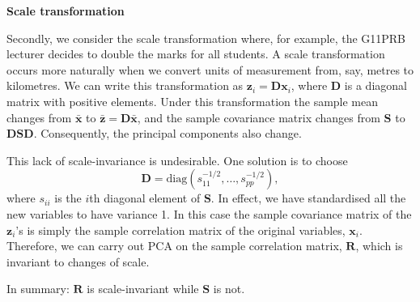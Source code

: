\documentclass[]{book}
\theoremstyle{definition}
\theoremstyle{definition}
\theoremstyle{definition}
\theoremstyle{remark}
\begin{document}
\textbf{Scale transformation}

Secondly, we consider the scale transformation where, for example, the G11PRB lecturer decides to double the marks for all students. A scale transformation occurs more naturally when we convert units of measurement from, say, metres to kilometres. We can write this transformation as \(\boldsymbol z_i = \boldsymbol D\boldsymbol x_i\), where \(\boldsymbol D\) is a diagonal matrix with positive elements. Under this transformation the sample mean changes from \(\bar{\boldsymbol x}\) to \(\bar{\boldsymbol z} = \boldsymbol D\bar{\boldsymbol x}\), and the sample covariance matrix changes from \(\boldsymbol S\) to \(\boldsymbol D\boldsymbol S\boldsymbol D\). Consequently, the principal components also change.

This lack of scale-invariance is undesirable. One solution is to choose
\[
\boldsymbol D= \text{diag}(s_{11}^{-1/2}, \ldots , s_{pp}^{-1/2}),
 \]
where \(s_{ii}\) is the \(i\)th diagonal element of \(\boldsymbol S\). In effect, we have standardised all the new variables to have variance 1. In this case the sample covariance matrix of the \(\boldsymbol z_i\)'s is simply the sample correlation matrix of the original variables, \(\boldsymbol x_i\). Therefore, we can carry out PCA on the sample correlation matrix, \(\boldsymbol R\), which is invariant to changes of scale.

In summary: \(\boldsymbol R\) is scale-invariant while \(\boldsymbol S\) is not.
\end{document}
